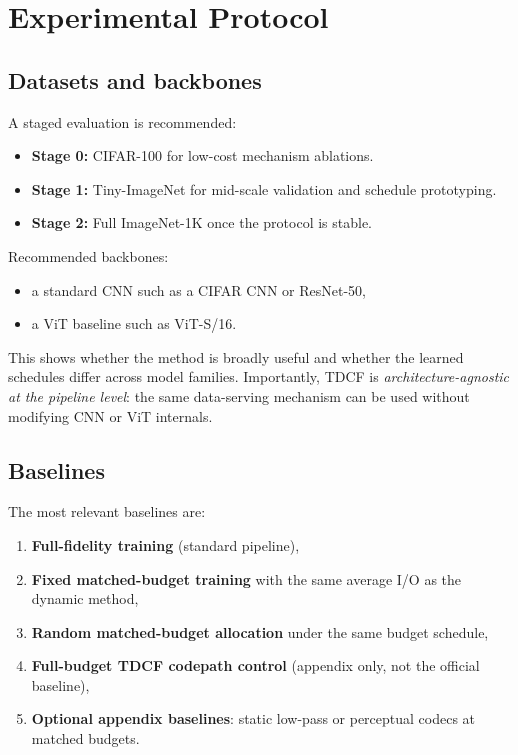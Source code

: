 \documentclass[10pt,twocolumn]{article}
\begin{document}
\section{Experimental Protocol}
\subsection{Datasets and backbones}
A staged evaluation is recommended:
\begin{itemize}
    \item \textbf{Stage 0:} CIFAR-100 for low-cost mechanism ablations.
    \item \textbf{Stage 1:} Tiny-ImageNet for mid-scale validation and schedule prototyping.
    \item \textbf{Stage 2:} Full ImageNet-1K once the protocol is stable.
\end{itemize}
Recommended backbones:
\begin{itemize}
    \item a standard CNN such as a CIFAR CNN or ResNet-50,
    \item a ViT baseline such as ViT-S/16.
\end{itemize}
This shows whether the method is broadly useful and whether the learned schedules differ across model families. Importantly, TDCF is \emph{architecture-agnostic at the pipeline level}: the same data-serving mechanism can be used without modifying CNN or ViT internals.

\subsection{Baselines}
The most relevant baselines are:
\begin{enumerate}
    \item \textbf{Full-fidelity training} (standard pipeline),
    \item \textbf{Fixed matched-budget training} with the same average I/O as the dynamic method,
    \item \textbf{Random matched-budget allocation} under the same budget schedule,
    \item \textbf{Full-budget TDCF codepath control} (appendix only, not the official baseline),
    \item \textbf{Optional appendix baselines}: static low-pass or perceptual codecs at matched budgets.
\end{enumerate}
\end{document}
